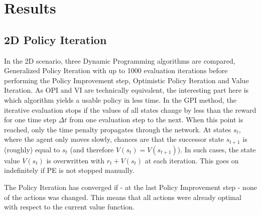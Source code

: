 \chapter{Results}
\label{chapter6}

\section{2D Policy Iteration}
\label{sec:results2d}
In the 2D scenario, three Dynamic Programming algorithms are compared, Generalized Policy Iteration with up to 1000 evaluation iterations before performing the Policy Improvement step, Optimistic Policy Iteration and Value Iteration. As OPI and VI are technically equivalent, the interesting part here is which algorithm yields a usable policy in less time. In the GPI method, the iterative evaluation stops if the values of all states change by less than the reward for one time step $\Delta t$ from one evaluation step to the next. When this point is reached, only the time penalty propagates through the network. At states $s_t$, where the agent only moves slowly, chances are that the successor state $s_{t+1}$ is (roughly) equal to $s_t$ (and therefore $V(s_t)=V(s_{t+1})$). In such cases, the state value $V(s_t)$ is overwritten with $r_t + V(s_t)$ at each iteration. This goes on indefinitely if PE is not stopped manually.

The Policy Iteration has converged if - at the last Policy Improvement step - none of the actions was changed. This means that all actions were already optimal with respect to the current value function. 

\dataOPTI

\dataDP


